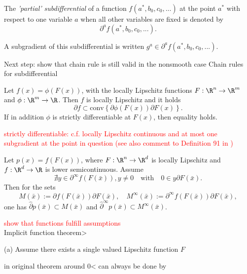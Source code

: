 The \emph{'partial' subdifferential} of a function \(f(a^*,b_0,c_0,...)\) at the point \(a^*\) with respect to one variable \(a\) when all other variables are fixed is denoted by 
\begin{equation*}
	\partial^{a} f(a^*,b_0,c_0,...).
\end{equation*}

A subgradient of this subdifferential is written \(g^{a} \in \partial^{a} f(a^*,b_0,c_0,...)\).

Next step: show that chain rule is still valid in the nonsmooth case
Chain rules for subdifferential \\

\begin{theorem}
	Let \(f(x)=\phi(F(x))\), with the locally Lipschitz functions \(F: \R^n \to \R^m\) and \(\phi:\R^m \to \R\). Then \(f\) is locally Lipschitz and it holds
	\begin{equation*}
		\partial f \subset \text{conv}\left\{\partial \phi(F(x))\partial F(x)\right\}.
	\end{equation*}
	If in addition \(\phi\) is strictly differentiable at \(F(x)\), then equality holds.
\end{theorem}

\textcolor{red}{strictly differentiable: c.f. \cite[Theorem 9.17 and 9.18]{Rockafellar2009} locally Lipschitz continuous and at most one subgradient at the point in question (see also comment to Definition 91 in \cite{Rockafellar2009})}

\begin{theorem}
	Let \(p(x) = f(F(x))\), where \(F:\R^n \to \R^d\) is locally Lipschitz and \(f:\R^d \to \R\) is lower semicontinuous. 
	Assume \[\nexists y \in \partial^{\infty}f(F(\bar{x})), y \neq 0 \quad \text{with} \quad 0 \in y \partial F(\bar{x}). \]
	Then for the sets 
	\[ M(\bar{x}):= \partial f(F(\bar{x}))\partial F(\bar{x}), \quad M^{\infty}(\bar{x}):= \partial^{\infty}f(F(\bar{x}))\partial F(\bar{x}), \]
	one has \(\hat{\partial}p(\bar{x}) \subset M(\bar{x})\) and \(\hat{\partial}^{\infty} p(\bar{x}) \subset M^{\infty}(\bar{x})\).
\end{theorem}

\textcolor{red}{show that functions fulfill assumptions}\\

Implicit function theorem>\\
\begin{theorem}
	(a) Assume there exists a single valued  Lipschitz function \(F\)
\end{theorem}
in original theorem around 0< can always be done by 

